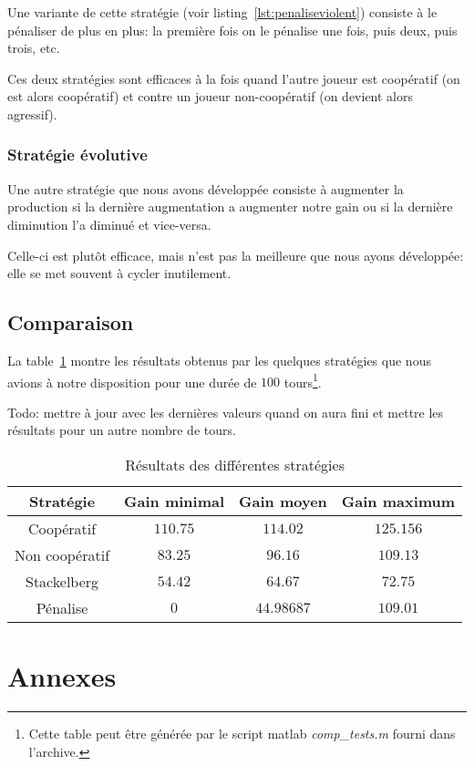 \documentclass{scrartcl}
\begin{document}
      Une variante de cette stratégie (voir listing~\ref{lst:penaliseviolent})
      consiste à le pénaliser de plus en plus: la première fois on le pénalise
      une fois, puis deux, puis trois, etc.

      Ces deux stratégies sont efficaces à la fois quand l'autre joueur est
      coopératif (on est alors coopératif) et contre un joueur non-coopératif
      (on devient alors agressif).

    \subsubsection{Stratégie évolutive}
      Une autre stratégie que nous avons développée consiste à augmenter la
      production si la dernière augmentation a augmenter notre gain ou si la
      dernière diminution l'a diminué et vice-versa.

      Celle-ci est plutôt efficace, mais n'est pas la meilleure que nous ayons
      développée: elle se met souvent à cycler inutilement.

  \subsection{Comparaison}
    La table~\ref{table:coop_results} montre les résultats obtenus par les
    quelques stratégies que nous avions à notre disposition pour une durée de
    $100$ tours\footnote{Cette table peut être générée par le script matlab
    \textit{comp\_tests.m} fourni dans l'archive.}.

    Todo: mettre à jour avec les dernières valeurs quand on aura fini et mettre
    les résultats pour un autre nombre de tours.
    \begin{table}[h]
      \centering
      \begin{tabular}{|c||c|c|c|}
        \hline
        Stratégie      & Gain minimal & Gain moyen & Gain maximum \\\hline\hline
        Coopératif     & $110.75$     & $114.02$   & $125.156$    \\\hline
        Non coopératif & $83.25$      & $96.16$    & $109.13$     \\\hline
        Stackelberg    & $54.42$      & $64.67$    & $72.75$      \\\hline
        Pénalise       & $0$          & $44.98687$ & $109.01$     \\\hline
      \end{tabular}
      \caption{Résultats des différentes stratégies}
      \label{table:coop_results}
    \end{table}
    
\section{Annexes}
  
  
  
  
  
\end{document}
